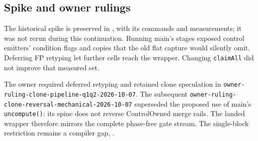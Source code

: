 \subsection*{Spike and owner rulings}
The historical spike  is preserved in
, with its commands and measurements;
it was not rerun during this continuation. Running main's stages exposed control
emitters' condition flags and copies that the old flat capture would silently
omit. Deferring FP retyping let further cells reach the wrapper. Changing
\texttt{claimAll} did not improve that measured set.

The owner required deferred retyping and retained clone speculation in
\texttt{owner-ruling-clone-pipeline-q1q2-2026-10-07}. The subsequent
\texttt{owner-ruling-clone-reversal-mechanical-2026-10-07} superseded the proposed
use of main's \texttt{uncompute()}: its spine does not reverse ControlOwned
merge rails. The landed wrapper therefore mirrors the complete phase-free gate
stream. The single-block restriction remains a compiler gap, .


